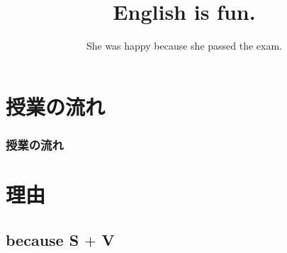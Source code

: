 \documentclass[aspectratio=169,xcolor={dvipsnames,table}]{beamer}
\title{English is fun.}
\subtitle{She was happy because she passed the exam.}
\author{}
\institute[]{}
\date[]
\begin{document}
\begin{frame}[plain]
  \titlepage
\end{frame}

\section*{授業の流れ}
\begin{frame}[plain]
  \frametitle{授業の流れ}
  \tableofcontents
\end{frame}

\section{理由}
\subsection{because S $+$ V}
\end{document}
